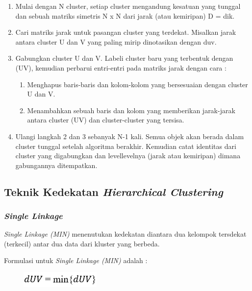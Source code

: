 \begin{enumerate}
    \item Mulai dengan N cluster, setiap cluster
mengandung kesatuan yang tunggal dan sebuah
matriks simetris N x N dari jarak (atau kemiripan)
D = {dik}.
    \item Cari matriks jarak untuk pasangan cluster yang
terdekat. Misalkan jarak antara cluster U dan V yang paling mirip dinotasikan dengan duv.
    \item Gabungkan cluster U dan V. Labeli cluster baru yang terbentuk dengan (UV), kemudian perbarui entri-entri pada matriks jarak dengan cara :
    \begin{enumerate}
        \item Menghapus baris-baris dan kolom-kolom yang bersesuaian dengan cluster U dan V.
        \item Menambahkan sebuah baris dan kolom yang memberikan jarak-jarak antara cluster (UV) dan cluster-cluster yang tersisa.
    \end{enumerate}

    \item  Ulangi langkah 2 dan 3 sebanyak N-1 kali. Semua objek akan berada dalam cluster tunggal setelah algoritma berakhir. Kemudian catat
identitas dari cluster yang digabungkan dan levellevelnya (jarak atau kemiripan) dimana gabungannya ditempatkan.
    
\end{enumerate} 
\subsection{Teknik Kedekatan \textit{Hierarchical Clustering}}
\subsubsection{\textit{Single Linkage}} 
\par
\par\textit{Single Linkage (MIN)} menenutukan kedekatan diantara dua kelompok tersdekat (terkecil) antar dua data dari kluster yang berbeda. 
\par Formulasi untuk \textit{Single Linkage (MIN)} adalah :
\begin{figure} [htbp]
\centering
    \includegraphics[scale=0.8] {figures/single.PNG}
    \label{fig:my_label}
\end{figure}

